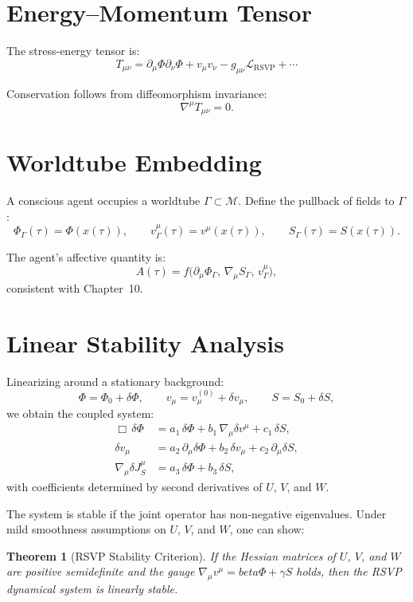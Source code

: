 \documentclass[12pt,oneside]{book}
\theoremstyle{plain}
\newtheorem{theorem}{Theorem}[chapter]
\theoremstyle{definition}
\def\beta{beta}%
\begin{document}
\section{Energy--Momentum Tensor}

The stress-energy tensor is:
\[
T_{\mu\nu}
=
\partial_\mu \Phi \partial_\nu \Phi
+ v_\mu v_\nu
- g_{\mu\nu} \mathcal{L}_{\mathrm{RSVP}}
+ \cdots
\]

Conservation follows from diffeomorphism invariance:
\[
\nabla^\mu T_{\mu\nu} = 0.
\]

\section{Worldtube Embedding}

A conscious agent occupies a worldtube $\Gamma \subset \mathcal{M}$.
Define the pullback of fields to $\Gamma$:
\[
\Phi_\Gamma(\tau)
= \Phi(x(\tau)), \qquad
v_\Gamma^\mu(\tau)
= v^\mu(x(\tau)), \qquad
S_\Gamma(\tau)
= S(x(\tau)).
\]

The agent's affective quantity is:
\begin{equation}
A(\tau)
=
f\bigl(
\partial_\mu \Phi_\Gamma,\,
\nabla_\mu S_\Gamma,\,
v^\mu_\Gamma
\bigr),
\end{equation}
consistent with Chapter~10.

\section{Linear Stability Analysis}

Linearizing around a stationary background:
\[
\Phi = \Phi_0 + \delta\Phi, \qquad
v_\mu = v^{(0)}_\mu + \delta v_\mu, \qquad
S = S_0 + \delta S,
\]
we obtain the coupled system:
\begin{align}
\Box\, \delta\Phi &= a_1\, \delta\Phi + b_1\, \nabla_\mu \delta v^\mu + c_1\, \delta S,\\
\delta v_\mu &= a_2\, \partial_\mu \delta\Phi + b_2\, \delta v_\mu + c_2\, \partial_\mu \delta S,\\
\nabla_\mu \delta J^\mu_S &= a_3\, \delta\Phi + b_3\, \delta S,
\end{align}
with coefficients determined by second derivatives of $U$, $V$, and $W$.

The system is stable if the joint operator has non-negative eigenvalues.
Under mild smoothness assumptions on $U$, $V$, and $W$, one can show:

\begin{theorem}[RSVP Stability Criterion]
If the Hessian matrices of $U$, $V$, and $W$ are positive semidefinite
and the gauge $\nabla_\mu v^\mu = \beta\Phi + \gamma S$ holds,
then the RSVP dynamical system is linearly stable.
\end{theorem}
\end{document}
